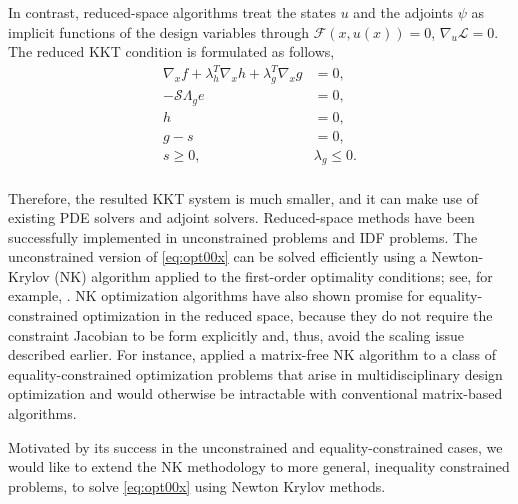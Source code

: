 \documentclass{article}
\theoremstyle{definition}
\begin{document}
In contrast, reduced-space algorithms treat the states $u$ and the adjoints $\psi$ as implicit functions of the design variables through $\mathcal{F}(x,u(x)) = 0$, $\nabla_u \mathcal{L} = 0$. The reduced KKT condition is formulated as follows, 
\begin{equation}\label{eq:opt00x}
\begin{aligned}
\nabla_x f + \lambda_h^T \nabla_x h + \lambda_g^T \nabla_x g &= 0, \\
-\mathcal{S} \Lambda_g e &= 0,\\
h &= 0, \\
g - s &= 0, \\
s \geq 0, \quad &\lambda_g \leq 0. \\
\end{aligned}
\end{equation}

Therefore, the resulted KKT system is much smaller, and it can make use of existing PDE solvers and adjoint solvers. Reduced-space methods have been successfully implemented in unconstrained problems and IDF problems. The unconstrained version of \eqref{eq:opt00x} can be solved efficiently using a Newton-Krylov (NK) algorithm applied to the first-order optimality conditions; see, for example, \cite{akcelik:2006, Heinkenschloss:1999:IOA, hinze2010optimization,borzi:2011}. NK optimization algorithms have also shown promise for equality-constrained optimization in the reduced space, because they do not require the constraint Jacobian to be form explicitly and, thus, avoid the scaling issue described earlier.  For instance, \cite{dener:idf2017} applied a matrix-free NK algorithm to a class of equality-constrained optimization problems that arise in multidisciplinary design optimization and would otherwise be intractable with conventional matrix-based algorithms.

Motivated by its success in the unconstrained and equality-constrained cases, we would like to extend the NK methodology to  more general, inequality constrained problems, to solve \eqref{eq:opt00x} using Newton Krylov methods. 

\end{document}
